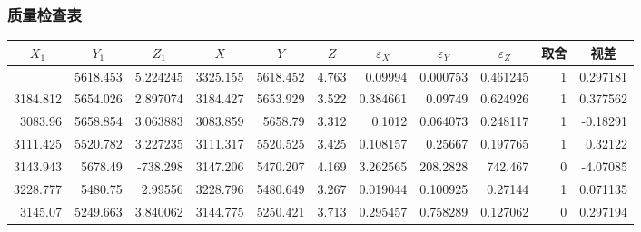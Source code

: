 \subsubsection{质量检查表}
 {\scriptsize
\begin{center}
    \begin{longtable}{rrrrrrrrrrr}
      \hline
    \multicolumn{1}{c}{$X_1$} & \multicolumn{1}{c}{$Y_1$} & \multicolumn{1}{c}{$Z_1$} & \multicolumn{1}{c}{$X$} & \multicolumn{1}{c}{$Y$} & \multicolumn{1}{c}{$Z$} & \multicolumn{1}{c}{$\varepsilon_X$} & \multicolumn{1}{c}{$\varepsilon_Y$} & \multicolumn{1}{c}{$\varepsilon_Z$} & \multicolumn{1}{c}{取舍} & \multicolumn{1}{c}{\cellcolor[rgb]{ 1,  .922,  .612}\textcolor[rgb]{ .612,  .396,  0}{视差}} \\ \hline
    \endhead
    \hline
    \endfoot
    3325.255 & 5618.453 & 5.224245 & 3325.155 & 5618.452 & 4.763 & 0.09994 & 0.000753 & 0.461245 & \cellcolor[rgb]{ 0,  1,  0}1 & 0.297181 \\
    3184.812 & 5654.026 & 2.897074 & 3184.427 & 5653.929 & 3.522 & 0.384661 & 0.09749 & 0.624926 & \cellcolor[rgb]{ 0,  1,  0}1 & 0.377562 \\
    3083.96 & 5658.854 & 3.063883 & 3083.859 & 5658.79 & 3.312 & 0.1012 & 0.064073 & 0.248117 & \cellcolor[rgb]{ 0,  1,  0}1 & -0.18291 \\
    3111.425 & 5520.782 & 3.227235 & 3111.317 & 5520.525 & 3.425 & 0.108157 & 0.25667 & 0.197765 & \cellcolor[rgb]{ 0,  1,  0}1 & 0.32122 \\
    3143.943 & 5678.49 & -738.298 & 3147.206 & 5470.207 & 4.169 & 3.262565 & 208.2828 & 742.467 & 0  & \cellcolor[rgb]{ 1,  .922,  .612}\textcolor[rgb]{ .612,  .396,  0}{-4.07085} \\
    3228.777 & 5480.75 & 2.99556 & 3228.796 & 5480.649 & 3.267 & 0.019044 & 0.100925 & 0.27144 & \cellcolor[rgb]{ 0,  1,  0}1 & 0.071135 \\
    3145.07 & 5249.663 & 3.840062 & 3144.775 & 5250.421 & 3.713 & 0.295457 & 0.758289 & 0.127062 & 0  & 0.297194 \\

\end{longtable}
\end{center}}
